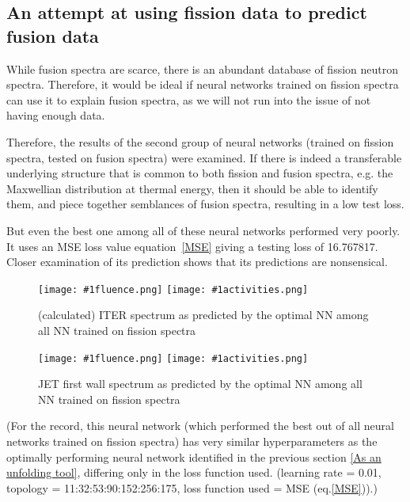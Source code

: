 \documentclass[a4paper, 12pt]{article}
\newcommand{\fluenceandactivities}[1]{
\texttt{[image: \#1fluence.png]}
\texttt{[image: \#1activities.png]}
}
\begin{document}
\subsection{An attempt at using fission data to predict fusion data}
While fusion spectra are scarce, there is an abundant database of fission neutron spectra. Therefore, it would be ideal if neural networks trained on fission spectra can use it to explain fusion spectra, as we will not run into the issue of not having enough data.

Therefore, the results of the second group of neural networks (trained on fission spectra, tested on fusion spectra) were examined. If there is indeed a transferable underlying structure that is common to both fission and fusion spectra, e.g. the Maxwellian distribution at thermal energy, then it should be able to identify them, and piece together semblances of fusion spectra, resulting in a low test loss.

But even the best one among all of these neural networks performed very poorly. It uses an MSE loss value equation~\ref{MSE} giving a testing loss of 16.767817. Closer examination of its prediction shows that its predictions are nonsensical.

\begin{figure}[H]
\centering
\fluenceandactivities{/home/ocean/Documents/GitHubDir/unfolding/unfolding/unfoldingsuite/neuralnetwork/realoutputEarlyStopping/SelectedNNreplicated/fission-fusion/0927_0226_5_layer_test_mse_1_test_007_}
\caption{(calculated) ITER spectrum as predicted by the optimal NN among all NN trained on fission spectra} \label{fission-fusionBad}
\end{figure}

\begin{figure}[H]
\centering
\fluenceandactivities{/home/ocean/Documents/GitHubDir/unfolding/unfolding/unfoldingsuite/neuralnetwork/realoutputEarlyStopping/SelectedNNreplicated/fission-fusion/0927_0226_5_layer_test_mse_1_test_016_}
\caption{JET first wall spectrum as predicted by the optimal NN among all NN trained on fission spectra}\label{fission-fusionGood}
\end{figure}

(For the record, this neural network (which performed the best out of all neural networks trained on fission spectra) has very similar hyperparameters as the optimally performing neural network identified in the previous section \ref{As an unfolding tool}, differing only in the loss function used. (learning rate = 0.01, topology = 11:32:53:90:152:256:175, loss function used = MSE (eq.\ref{MSE})).)
\end{document}
